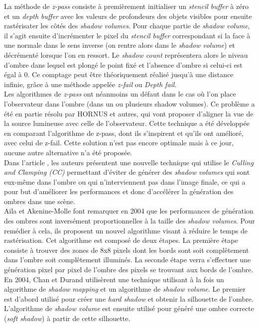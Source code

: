 \documentclass[a4paper,10pt]{report}
\begin{document}
La méthode de \textit{z-pass} consiste à premièrement initialiser un \textit{stencil buffer} à zéro et un \textit{depth buffer} avec les valeurs de profondeurs des objets visibles pour ensuite rastérisater les côtés des \textit{shadow volumes}. Pour chaque partie de \textit{shadow volume}, il s'agit ensuite d'incrémenter le pixel du \textit{stencil buffer} correspondant si la face à une normale dans le sens inverse (on rentre alors dans le \textit{shadow volume}) et décrémenté lorsque l'on en ressort. Le \textit{shadow count} représentera alors le niveau d'ombre dans lequel est plongé le point fixé et l'absence d'ombre si celui-ci est égal à 0.\cite{surveyofshadowalgorithms} Ce comptage peut être théoriquement réalisé jusqu'à une distance infinie, grâce à une méthode appelée \textit{z-fail} ou \textit{Depth fail}\cite{bilodeau1999real, carmack2000z}.
\\

Les algorithmes de \textit{z-pass} ont néanmoins un défaut dans le cas où l'on place l'observateur dans l'ombre (dans un ou plusieurs shadow volumes). Ce problème a été en partie résolu par HORNUS et autres\cite{hornus2005zp+}, qui vont proposer d'aligner la vue de la source lumineuse avec celle de l'observateur. Cette technique a été développée en comparant l'algorithme de z-pass, dont ils s'inspirent et qu'ils ont amélioré, avec celui de z-fail. Cette solution n'est pas encore optimale mais à ce jour, aucune autre alternative n'a été proposée.
\\

Dans l'article \cite{lloyd2004cc}, les auteurs présentent une nouvelle technique qui utilise le \textit{Culling and Clamping (CC)} permettant d'éviter de générer des \textit{shadow volumes} qui sont eux-même dans l'ombre ou qui n'interviennent pas dans l'image finale, ce qui a pour but d'améliorer les performances et donc d'accélérer la génération des ombres dans une scène.
\\

Aila et Akenine-Molle font remarquer en 2004 \cite{aila2004hierarchical} que les performances de génération des ombres sont inversément proportionnelles à la taille des \textit{shadow volumes}. Pour remédier à cela, ils proposent un nouvel algorithme visant à réduire le temps de rastérisation. Cet algorithme est composé de deux étapes. La première étape consiste à trouver des zones de 8x8 pixels dont les bords sont soit complêtement dans l'ombre soit complêtement illuminés. La seconde étape verra s'effectuer une génération pixel par pixel de l'ombre des pixels se trouvant aux bords de l'ombre.
\\
En 2004, Chan et Durand\cite{chan2004efficient} utilisèrent une technique utilisant à la fois un algorithme de \textit{shadow mapping} et un algorithme de \textit{shadow volume}. Le premier est d'abord utilisé pour créer une \textit{hard shadow} et obtenir la silhouette de l'ombre. L'algorithme de \textit{shadow volume} est ensuite utilisé pour généré une ombre correcte (\textit{soft shadow}) à partir de cette silhouette.
\end{document}
